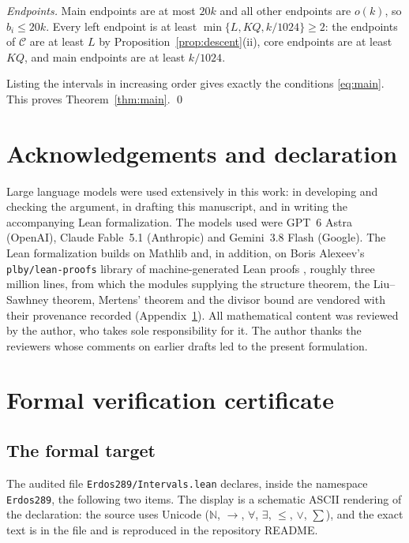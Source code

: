\documentclass[11pt,letterpaper]{article}
\numberwithin{equation}{section}
\theoremstyle{plain}
\theoremstyle{remark}
\newcommand{\N}{\mathbb N}
\newcommand{\cC}{\mathcal C}
\begin{document}
\emph{Endpoints.} Main endpoints are at most $20k$ and all other endpoints are $o(k)$, so $b_i\le20k$. Every left endpoint is at least $\min\{L,KQ,k/1024\}\ge2$: the endpoints of $\cC$ are at least $L$ by Proposition~\ref{prop:descent}(ii), core endpoints are at least $KQ$, and main endpoints are at least $k/1024$.

Listing the intervals in increasing order gives exactly the conditions \eqref{eq:main}. This proves Theorem~\ref{thm:main}. \qed

\section*{Acknowledgements and declaration}

Large language models were used extensively in this work: in developing and checking the argument, in drafting this manuscript, and in writing the accompanying Lean formalization. The models used were GPT~6 Astra (OpenAI), Claude Fable~5.1 (Anthropic) and Gemini~3.8 Flash (Google). The Lean formalization builds on Mathlib and, in addition, on Boris Alexeev's \texttt{plby/lean-proofs} library of machine-generated Lean proofs \cite{plby}, roughly three million lines, from which the modules supplying the structure theorem, the Liu--Sawhney theorem, Mertens' theorem and the divisor bound are vendored with their provenance recorded (Appendix~\ref{app:cert}). All mathematical content was reviewed by the author, who takes sole responsibility for it. The author thanks the reviewers whose comments on earlier drafts led to the present formulation.

\appendix

\section{Formal verification certificate}\label{app:cert}

\subsection{The formal target}\label{app:target}

The audited file \texttt{Erdos289/Intervals.lean} declares, inside the namespace \texttt{Erdos289}, the following two items. The display is a schematic ASCII rendering of the declaration: the source uses Unicode ($\N$, $\to$, $\forall$, $\exists$, $\le$, $\vee$, $\sum$), and the exact text is in the file and is reproduced in the repository README.
\end{document}

